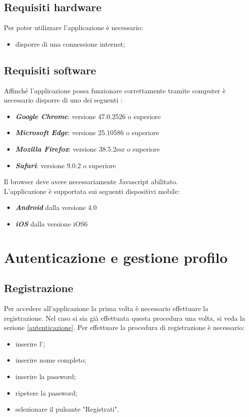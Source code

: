 \documentclass[12pt,a4paper]{article}
\begin{document}
	\subsection{Requisiti hardware}
	Per poter utilizzare l'applicazione \prj{} è necessario:
	\begin{itemize}
		\item disporre di una connessione internet;
	\end{itemize}
	\subsection{Requisiti software}
	
	Affinché l’applicazione possa funzionare correttamente tramite computer  è necessario disporre di uno dei seguenti :
	\begin{itemize}
		\item \textit{\textbf{Google Chrome}}: versione  47.0.2526 o superiore
		\item \textit{\textbf{Microsoft Edge}}: versione 25.10586 o superiore
	\item \textit{\textbf{Mozilla Firefox}}: versione 38.5.2esr o superiore
	\item\textit{\textbf{Safari}}: versione 9.0.2 o superiore
	\end{itemize}
	Il browser deve avere necessariamente Javascript abilitato.\\
	
 L'applicazione è supportata sui seguenti dispositivi mobile:
	\begin{itemize}
	\item \textit{\textbf{Android}} dalla versione 4.0
	\item \textit{\textbf{iOS}} dalla versione iOS6
\end{itemize}

	\newpage
	\section{Autenticazione e gestione profilo}
	\subsection{Registrazione}\label{registrazione}
	Per accedere all'applicazione la prima volta è necessario effettuare la registrazione. Nel caso si sia già effettuata questa procedura una volta, si veda la sezione \ref{autenticazione}.
	Per effettuare la procedura di registrazione è necessario:
	\begin{itemize}
		\item inserire l';
		\item inserire nome completo;
		\item inserire la password;
		\item ripetere la password;
		\item selezionare il pulsante "Registrati". 
	\end{itemize}
\end{document}
